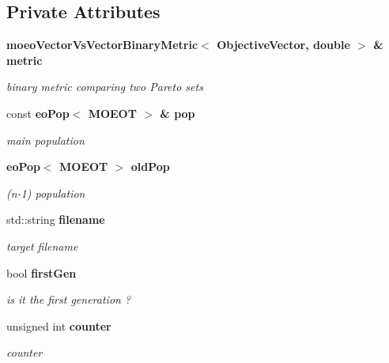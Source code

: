 \subsection*{Private Attributes}
\begin{CompactItemize}
\item 
\bf{moeo\-Vector\-Vs\-Vector\-Binary\-Metric}$<$ \bf{Objective\-Vector}, double $>$ \& \bf{metric}\label{classmoeoBinaryMetricSavingUpdater_d1c66d6d179aff03d6949f4f76d3237c}

\begin{CompactList}\small\item\em binary metric comparing two Pareto sets \item\end{CompactList}\item 
const \bf{eo\-Pop}$<$ MOEOT $>$ \& \bf{pop}\label{classmoeoBinaryMetricSavingUpdater_79eea0916733568929ea9c0758ffe8fa}

\begin{CompactList}\small\item\em main population \item\end{CompactList}\item 
\bf{eo\-Pop}$<$ MOEOT $>$ \bf{old\-Pop}\label{classmoeoBinaryMetricSavingUpdater_0461af7e569921fec49538ff8fa998d4}

\begin{CompactList}\small\item\em (n-1) population \item\end{CompactList}\item 
std::string \bf{filename}\label{classmoeoBinaryMetricSavingUpdater_6d280c180de7bab1e18ab2bb39a0e184}

\begin{CompactList}\small\item\em target filename \item\end{CompactList}\item 
bool \bf{first\-Gen}\label{classmoeoBinaryMetricSavingUpdater_9bfa927499265f53f2b25afd2cd3c94f}

\begin{CompactList}\small\item\em is it the first generation ? \item\end{CompactList}\item 
unsigned int \bf{counter}\label{classmoeoBinaryMetricSavingUpdater_d8d3ce9ac8ab5a57ee1840bc1c98d776}

\begin{CompactList}\small\item\em counter \item\end{CompactList}\end{CompactItemize}


